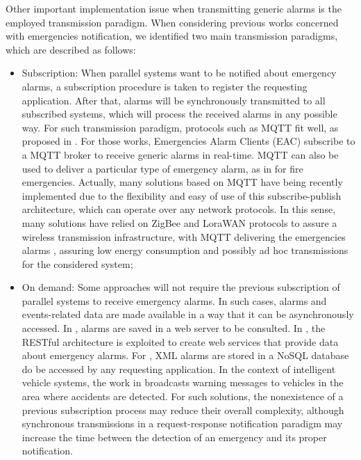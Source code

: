 \begin{refsection}
Other important implementation issue when transmitting generic alarms is the employed transmission paradigm. When considering previous works concerned with emergencies notification, we identified two main transmission paradigms, which are described as follows:

\begin{itemize}
  \item Subscription: When parallel systems want to be notified about emergency alarms, a subscription procedure is taken to register the requesting application. After that, alarms will be synchronously transmitted to all subscribed systems, which will process the received alarms in any possible way. For such transmission paradigm, protocols such as MQTT fit well, as proposed in \cite{emergenciesmetric2,emergenciesmetric3}. For those works, Emergencies Alarm Clients (EAC) subscribe to a MQTT broker to receive generic alarms in real-time. MQTT can also be used to deliver a particular type of emergency alarm, as in \cite{iotFire3,iotmqtt} for fire emergencies. Actually, many solutions based on MQTT have being recently implemented due to the flexibility and easy of use of this subscribe-publish architecture, which can operate over any network protocols. In this sense, many solutions have relied on ZigBee and LoraWAN protocols to assure a wireless transmission infrastructure, with MQTT delivering the emergencies alarms \cite{iotFire3,lora2,iotmqtt2}, assuring low energy consumption and possibly ad hoc transmissions for the considered system;
  
  \item On demand: Some approaches will not require the previous subscription of parallel systems to receive emergency alarms. In such cases, alarms and events-related data are made available in a way that it can be asynchronously accessed. In \cite{emergenciesmetric5}, alarms are saved in a web server to be consulted. In \cite{iotgadget1}, the RESTful architecture is exploited to create web services that provide data about emergency alarms. For \cite{emergenciesxml2}, XML alarms are stored in a NoSQL database do be accessed by any requesting application. In the context of intelligent vehicle systems, the work in \cite{citiesvehicles3} broadcasts warning messages to vehicles in the area where accidents are detected. For such solutions, the nonexistence of a previous subscription process may reduce their overall complexity, although synchronous transmissions in a request-response notification paradigm may increase the time between the detection of an emergency and its proper notification.
\end{itemize}


\end{refsection}
